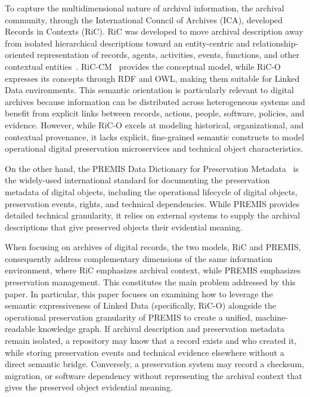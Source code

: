 \documentclass[runningheads]{llncs}
\begin{document}
	To capture the multidimensional nature of archival information, the archival community, through the International Council of Archives (ICA), developed Records in Contexts (RiC). RiC was developed to move archival description away from isolated hierarchical descriptions toward an entity-centric and relationship-oriented representation of records, agents, activities, events, functions, and other contextual entities~\cite{llanes2017records}. RiC-CM~\cite{llanes2017records,RICCM} provides the conceptual model, while RiC-O~\cite{RiCO} expresses its concepts through RDF and OWL, making them suitable for Linked Data environments. This semantic orientation is particularly relevant to digital archives because information can be distributed across heterogeneous systems and benefit from explicit links between records, actions, people, software, policies, and evidence. However, while RiC-O excels at modeling historical, organizational, and contextual provenance, it lacks explicit, fine-grained semantic constructs to model operational digital preservation microservices and technical object characteristics. 
	
	On the other hand, the PREMIS Data Dictionary for Preservation Metadata~\cite{premis_data_dictionary_2015} is the widely-used international standard for documenting the preservation metadata of digital objects, including the operational lifecycle of digital objects, preservation events, rights, and technical dependencies. While PREMIS provides detailed technical granularity, it relies on external systems to supply the archival descriptions that give preserved objects their evidential meaning. 
	
	When focusing on archives of digital records, the two models, RiC and PREMIS, consequently address complementary dimensions of the same information environment, where RiC emphasizes archival context, while PREMIS emphasizes preservation management. This constitutes the main problem addressed by this paper. In particular, this paper focuses on examining how to leverage the semantic expressiveness of Linked Data (specifically, RiC-O) alongside the operational preservation granularity of PREMIS to create a unified, machine-readable knowledge graph.  If archival description and preservation metadata remain isolated, a repository may know that a record exists and who created it, while storing preservation events and technical evidence elsewhere without a direct semantic bridge. Conversely, a preservation system may record a checksum, migration, or software dependency without representing the archival context that gives the preserved object evidential meaning.
	
\end{document}
